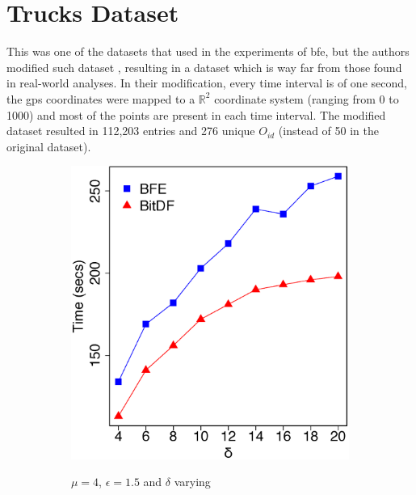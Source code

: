 {\section{Trucks Dataset}
\label{sec:trucks}
This was one of the datasets that  used in the experiments of \ac{bfe}, but the authors modified such
dataset \cite{trucksdataset}, resulting in a dataset which is way far from those found in real-world analyses. In their
modification, every time interval is of one second, the \ac{gps} coordinates were mapped to a $\mathbb{R}^2$ coordinate
system (ranging from 0 to 1000) and most of the points are present in each time interval. The modified dataset resulted
in 112,203 entries and 276 unique $O_{id}$ (instead of 50 in the original dataset).

\begin{figure}[h!]
    \centering
    \caption{Results varying $\delta$ and $\epsilon$ for Trucks dataset}
    \begin{subfigure}[t]{0.48\textwidth}
        \caption{$\mu = 4$, $\epsilon = 1.5$ and $\delta$ varying}
        \includegraphics[width=\textwidth]{images/Trucks_n_4_g_1_5_varying_l.eps}
        \label{fig:trucks_vary_l}
    \end{subfigure}
    \begin{subfigure}[t]{0.48\textwidth}

\end{subfigure}
\end{figure}}
